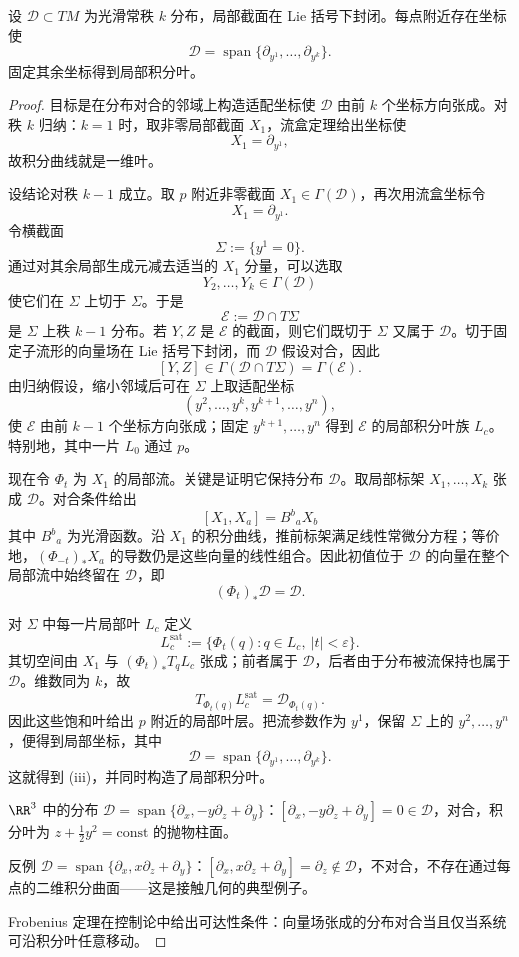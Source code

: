 \begin{theorem}
设 $\mathcal D\subset TM$ 为光滑常秩 $k$ 分布，局部截面在 Lie 括号下封闭。每点附近存在坐标使\[\mathcal D=\operatorname{span}\{\partial_{y^1},\ldots,\partial_{y^k}\}.\]固定其余坐标得到局部积分叶。
\end{theorem}

\begin{proof}
目标是在分布对合的邻域上构造适配坐标使 $\mathcal D$ 由前 $k$ 个坐标方向张成。对秩 $k$ 归纳：$k=1$ 时，取非零局部截面 $X_1$，流盒定理给出坐标使
\[
X_1=\partial_{y^1},
\]
故积分曲线就是一维叶。

设结论对秩 $k-1$ 成立。取 $p$ 附近非零截面 $X_1\in\Gamma(\mathcal D)$，再次用流盒坐标令
\[
X_1=\partial_{y^1}.
\]
令横截面
\[
\Sigma:=\{y^1=0\}.
\]
通过对其余局部生成元减去适当的 $X_1$ 分量，可以选取
\[
Y_2,\ldots,Y_k\in\Gamma(\mathcal D)
\]
使它们在 $\Sigma$ 上切于 $\Sigma$。于是
\[
\mathcal E:=\mathcal D\cap T\Sigma
\]
是 $\Sigma$ 上秩 $k-1$ 分布。若 $Y,Z$ 是 $\mathcal E$ 的截面，则它们既切于 $\Sigma$ 又属于 $\mathcal D$。切于固定子流形的向量场在 Lie 括号下封闭，而 $\mathcal D$ 假设对合，因此
\[
[Y,Z]\in\Gamma(\mathcal D\cap T\Sigma)=\Gamma(\mathcal E).
\]
由归纳假设，缩小邻域后可在 $\Sigma$ 上取适配坐标
\[
(y^2,\ldots,y^k,y^{k+1},\ldots,y^n),
\]
使 $\mathcal E$ 由前 $k-1$ 个坐标方向张成；固定
$y^{k+1},\ldots,y^n$ 得到 $\mathcal E$ 的局部积分叶族 $L_c$。特别地，其中一片 $L_0$ 通过 $p$。

现在令 $\Phi_t$ 为 $X_1$ 的局部流。关键是证明它保持分布 $\mathcal D$。取局部标架 $X_1,\ldots,X_k$ 张成 $\mathcal D$。对合条件给出
\[
[X_1,X_a]=B^b{}_aX_b
\]
其中 $B^b{}_a$ 为光滑函数。沿 $X_1$ 的积分曲线，推前标架满足线性常微分方程；等价地，$(\Phi_{-t})_*X_a$ 的导数仍是这些向量的线性组合。因此初值位于 $\mathcal D$ 的向量在整个局部流中始终留在 $\mathcal D$，即
\[
(\Phi_t)_*\mathcal D=\mathcal D.
\]

对 $\Sigma$ 中每一片局部叶 $L_c$ 定义
\[
L_c^{\mathrm{sat}}
:=\{\Phi_t(q):q\in L_c,\ |t|<\varepsilon\}.
\]
其切空间由 $X_1$ 与 $(\Phi_t)_*T_qL_c$ 张成；前者属于 $\mathcal D$，后者由于分布被流保持也属于 $\mathcal D$。维数同为 $k$，故
\[
T_{\Phi_t(q)}L_c^{\mathrm{sat}}
=\mathcal D_{\Phi_t(q)}.
\]
因此这些饱和叶给出 $p$ 附近的局部叶层。把流参数作为 $y^1$，保留 $\Sigma$ 上的
$y^2,\ldots,y^n$，便得到局部坐标，其中
\[
\mathcal D
=\operatorname{span}\{\partial_{y^1},\ldots,\partial_{y^k}\}.
\]
这就得到 (iii)，并同时构造了局部积分叶。

$\RR^3$ 中的分布 $\mathcal D=\operatorname{span}\{\partial_x,-y\partial_z+\partial_y\}$：$[\partial_x,-y\partial_z+\partial_y]=0\in\mathcal D$，对合，积分叶为 $z+\tfrac12y^2=\text{const}$ 的抛物柱面。

反例 $\mathcal D=\operatorname{span}\{\partial_x,x\partial_z+\partial_y\}$：$[\partial_x,x\partial_z+\partial_y]=\partial_z\notin\mathcal D$，不对合，不存在通过每点的二维积分曲面——这是接触几何的典型例子。

Frobenius 定理在控制论中给出可达性条件：向量场张成的分布对合当且仅当系统可沿积分叶任意移动。
\end{proof}

